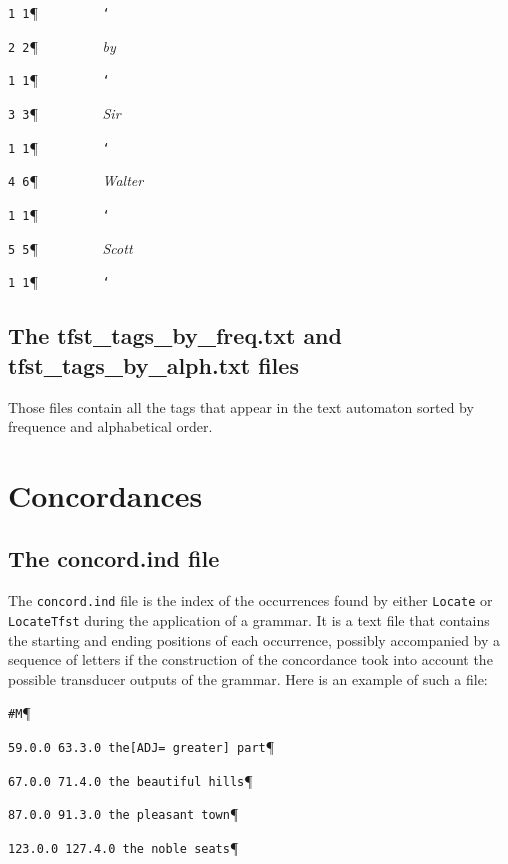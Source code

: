 \noindent \verb$1 1$\P \verb$         $\texttt{\char `\ }

\noindent \verb$2 2$\P \verb$         $\textit{by}

\noindent \verb$1 1$\P \verb$         $\texttt{\char `\ }

\noindent \verb$3 3$\P \verb$         $\textit{Sir}

\noindent \verb$1 1$\P \verb$         $\texttt{\char `\ }

\noindent \verb$4 6$\P \verb$         $\textit{Walter}

\noindent \verb$1 1$\P \verb$         $\texttt{\char `\ }

\noindent \verb$5 5$\P \verb$         $\textit{Scott}

\noindent \verb$1 1$\P \verb$         $\texttt{\char `\ }


\subsection{The tfst\_tags\_by\_freq.txt and tfst\_tags\_by\_alph.txt files}
Those files contain all the tags that appear in the text automaton sorted by frequence and alphabetical order.


\section{Concordances}
\subsection{The concord.ind file}
The \verb+concord.ind+ file is the index of the occurrences found by either
\verb+Locate+ or \verb+LocateTfst+ during the application of a grammar. It is a
text file that contains the starting and ending positions of each occurrence,
possibly accompanied by a sequence of letters if the construction of the concordance took
into account the possible transducer outputs of the grammar. 
Here is an example
of such a file:

\bigskip
\verb$#M$\P

\verb$59.0.0 63.3.0 the[ADJ= greater] part$\P

\verb$67.0.0 71.4.0 the beautiful hills$\P

\verb$87.0.0 91.3.0 the pleasant town$\P

\verb$123.0.0 127.4.0 the noble seats$\P

